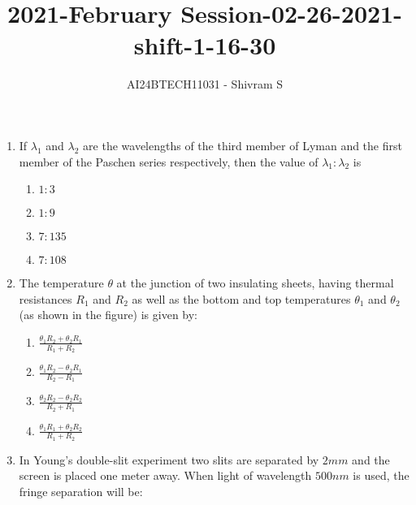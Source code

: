 \documentclass[journal]{IEEEtran}
\begin{document}

\onecolumn

\title{2021-February Session-02-26-2021-shift-1-16-30}
\author{AI24BTECH11031 - Shivram S}
\maketitle
\bigskip

\renewcommand{\thefigure}{\theenumi}
\renewcommand{\thetable}{\theenumi}

\begin{enumerate}
    \item If $\lambda_1$ and $\lambda_2$ are the wavelengths of the third member of
    Lyman and the first member of the Paschen series respectively, then the value
    of $\lambda_1:\lambda_2$ is

    \begin{multicols}{4}
    \begin{enumerate}
        \item $1:3$
        \item $1:9$
        \item $7:135$
        \item $7:108$
    \end{enumerate}
    \end{multicols}

    \item The temperature $\theta$ at the junction of two insulating sheets, having
    thermal resistances $R_1$ and $R_2$ as well as the bottom and top temperatures
    $\theta_1$ and $\theta_2$ (as shown in the figure) is given by:

    \begin{multicols}{2}
    \begin{enumerate}
        \item $\frac{\theta_1R_2 + \theta_2R_1}{R_1 + R_2}$
        \item $\frac{\theta_1R_2 - \theta_2R_1}{R_2 - R_1}$
        \item $\frac{\theta_2R_2 - \theta_2R_2}{R_2 + R_1}$
        \item $\frac{\theta_1R_1 + \theta_2R_2}{R_1 + R_2}$
    \end{enumerate}
    \end{multicols}

    \item In Young's double-slit experiment two slits are separated by $2 mm$ and the
    screen is placed one meter away. When light of wavelength $500 nm$ is used, the
    fringe separation will be:


\end{enumerate}
\end{document}
